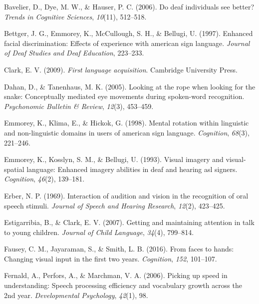 \documentclass[,man,floatsintext]{apa6}
\begin{document}
\leavevmode\hypertarget{ref-bavelier2006deaf}{}%
Bavelier, D., Dye, M. W., \& Hauser, P. C. (2006). Do deaf individuals
see better? \emph{Trends in Cognitive Sciences}, \emph{10}(11),
512--518.

\leavevmode\hypertarget{ref-bettger1997enhanced}{}%
Bettger, J. G., Emmorey, K., McCullough, S. H., \& Bellugi, U. (1997).
Enhanced facial discrimination: Effects of experience with american sign
language. \emph{Journal of Deaf Studies and Deaf Education}, 223--233.

\leavevmode\hypertarget{ref-clark2009first}{}%
Clark, E. V. (2009). \emph{First language acquisition}. Cambridge
University Press.

\leavevmode\hypertarget{ref-dahan2005looking}{}%
Dahan, D., \& Tanenhaus, M. K. (2005). Looking at the rope when looking
for the snake: Conceptually mediated eye movements during spoken-word
recognition. \emph{Psychonomic Bulletin \& Review}, \emph{12}(3),
453--459.

\leavevmode\hypertarget{ref-emmorey1998mental}{}%
Emmorey, K., Klima, E., \& Hickok, G. (1998). Mental rotation within
linguistic and non-linguistic domains in users of american sign
language. \emph{Cognition}, \emph{68}(3), 221--246.

\leavevmode\hypertarget{ref-emmorey1993visual}{}%
Emmorey, K., Kosslyn, S. M., \& Bellugi, U. (1993). Visual imagery and
visual-spatial language: Enhanced imagery abilities in deaf and hearing
asl signers. \emph{Cognition}, \emph{46}(2), 139--181.

\leavevmode\hypertarget{ref-erber1969interaction}{}%
Erber, N. P. (1969). Interaction of audition and vision in the
recognition of oral speech stimuli. \emph{Journal of Speech and Hearing
Research}, \emph{12}(2), 423--425.

\leavevmode\hypertarget{ref-estigarribia2007getting}{}%
Estigarribia, B., \& Clark, E. V. (2007). Getting and maintaining
attention in talk to young children. \emph{Journal of Child Language},
\emph{34}(4), 799--814.

\leavevmode\hypertarget{ref-fausey2016faces}{}%
Fausey, C. M., Jayaraman, S., \& Smith, L. B. (2016). From faces to
hands: Changing visual input in the first two years. \emph{Cognition},
\emph{152}, 101--107.

\leavevmode\hypertarget{ref-fernald2006picking}{}%
Fernald, A., Perfors, A., \& Marchman, V. A. (2006). Picking up speed in
understanding: Speech processing efficiency and vocabulary growth across
the 2nd year. \emph{Developmental Psychology}, \emph{42}(1), 98.
\end{document}
